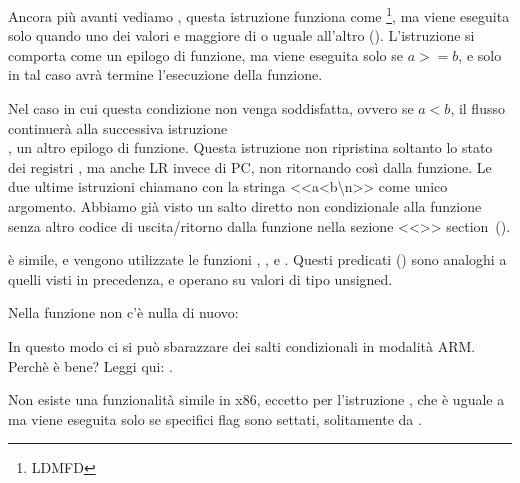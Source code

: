 
Ancora più avanti vediamo , questa istruzione funziona come \footnote{\ac{LDMFD}},
ma viene eseguita solo quando uno dei valori e maggiore di o uguale all'altro ().
L'istruzione  si comporta come un epilogo di funzione, ma viene eseguita solo se $a>=b$, e solo in tal caso avrà termine l'esecuzione della funzione.


Nel caso in cui questa condizione non venga soddisfatta, ovvero se $a<b$, il flusso continuerà alla successiva istruzione \\
 , un altro epilogo di funzione. Questa istruzione non ripristina soltanto lo stato dei registri  , ma anche \ac{LR} invece di \ac{PC}, non ritornando così dalla funzione.
Le due ultime istruzioni chiamano \printf con la stringa <<a<b\textbackslash{}n>> come unico argomento.
Abbiamo già visto un salto diretto non condizionale alla funzione \printf senza altro codice di uscita/ritorno dalla funzione nella sezione <<\PrintfSeveralArgumentsSectionName>> section~().

 è simile, e vengono utilizzate le funzioni , , e . Questi predicati () sono analoghi a quelli visti in precedenza, e operano su valori di tipo unsigned.

Nella funzione \main non c'è nulla di nuovo:



In questo modo ci si può sbarazzare dei salti condizionali in modalità ARM.
Perchè è bene? Leggi qui: .


Non esiste una funzionalità simile in x86, eccetto per l'istruzione  , che è uguale a \MOV ma viene eseguita solo
se specifici flag sono settati, solitamente da \CMP.

\mysubparagraph{\OptimizingKeilVI (\ThumbMode)}



